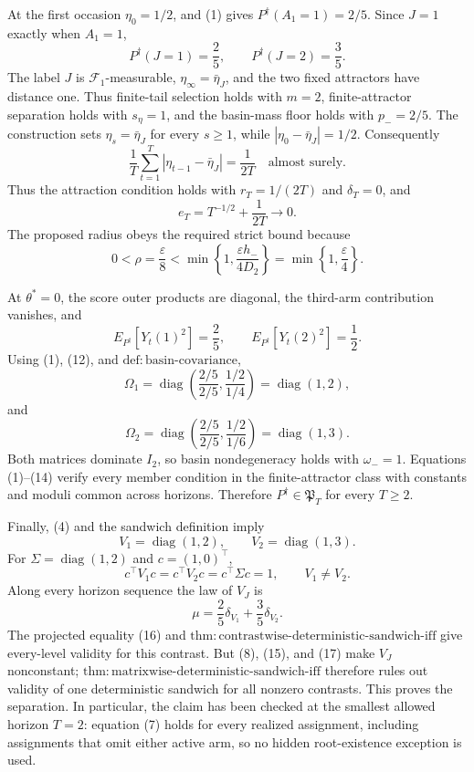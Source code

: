 At the first occasion \(\eta_0=1/2\), and (1) gives \(P^{\dagger}(A_1=1)=2/5\). Since \(J=1\) exactly when \(A_1=1\),
\[
 P^{\dagger}(J=1)=\frac25,
 \qquad P^{\dagger}(J=2)=\frac35.
\tag{8}
\]
The label \(J\) is \(\mathcal F_1\)-measurable, \(\eta_\infty=\bar\eta_J\), and the two fixed attractors have distance one. Thus finite-tail selection holds with \(m=2\), finite-attractor separation holds with \(s_\eta=1\), and the basin-mass floor holds with \(p_-=2/5\). The construction sets \(\eta_s=\bar\eta_J\) for every \(s\ge1\), while \(|\eta_0-\bar\eta_J|=1/2\). Consequently
\[
 \frac1T\sum_{t=1}^T|\eta_{t-1}-\bar\eta_J|=\frac1{2T}
 \quad\text{almost surely}.
\tag{9}
\]
Thus the attraction condition holds with \(r_T=1/(2T)\) and \(\delta_T=0\), and
\[
 e_T=T^{-1/2}+\frac1{2T}\longrightarrow0.
\tag{10}
\]
The proposed radius obeys the required strict bound because
\[
 0<\rho=\frac\varepsilon8
 <\min\left\{1,\frac{\varepsilon h_-}{4D_2}\right\}
 =\min\left\{1,\frac\varepsilon4\right\}.
\tag{11}
\]

At \(\theta^*=0\), the score outer products are diagonal, the third-arm contribution vanishes, and
\[
 E_{P^{\dagger}}[Y_t(1)^2]=\frac25,
 \qquad E_{P^{\dagger}}[Y_t(2)^2]=\frac12.
\tag{12}
\]
Using (1), (12), and \(\mathrm{def:basin\text{-}covariance}\),
\[
 \Omega_1=\operatorname{diag}\left(\frac{2/5}{2/5},\frac{1/2}{1/4}\right)
 =\operatorname{diag}(1,2),
\tag{13}
\]
and
\[
 \Omega_2=\operatorname{diag}\left(\frac{2/5}{2/5},\frac{1/2}{1/6}\right)
 =\operatorname{diag}(1,3).
\tag{14}
\]
Both matrices dominate \(I_2\), so basin nondegeneracy holds with \(\omega_-=1\). Equations (1)--(14) verify every member condition in the finite-attractor class with constants and moduli common across horizons. Therefore \(P^{\dagger}\in\mathfrak P_T\) for every \(T\ge2\).

Finally, (4) and the sandwich definition imply
\[
 V_1=\operatorname{diag}(1,2),
 \qquad V_2=\operatorname{diag}(1,3).
\tag{15}
\]
For \(\Sigma=\operatorname{diag}(1,2)\) and \(c=(1,0)^\top\),
\[
 c^\top V_1c=c^\top V_2c=c^\top\Sigma c=1,
 \qquad V_1\ne V_2.
\tag{16}
\]
Along every horizon sequence the law of \(V_J\) is
\[
 \mu=\frac25\delta_{V_1}+\frac35\delta_{V_2}.
\tag{17}
\]
The projected equality (16) and \(\mathrm{thm:contrastwise\text{-}deterministic\text{-}sandwich\text{-}iff}\) give every-level validity for this contrast. But (8), (15), and (17) make \(V_J\) nonconstant; \(\mathrm{thm:matrixwise\text{-}deterministic\text{-}sandwich\text{-}iff}\) therefore rules out validity of one deterministic sandwich for all nonzero contrasts. This proves the separation. In particular, the claim has been checked at the smallest allowed horizon \(T=2\): equation (7) holds for every realized assignment, including assignments that omit either active arm, so no hidden root-existence exception is used.